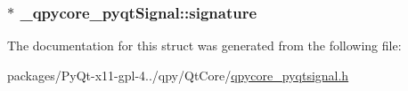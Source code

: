 \subsubsection[{signature}]{$\ast$ \+\_\+qpycore\+\_\+pyqt\+Signal\+::signature}\label{struct__qpycore__pyqtSignal_a9e4afc58539fccafe55e9f272612a6e8}


The documentation for this struct was generated from the following file\+:\begin{DoxyCompactItemize}
\item 
packages/\+Py\+Qt-\/x11-\/gpl-\/4../qpy/\+Qt\+Core/\hyperlink{qpycore__pyqtsignal_8h}{qpycore\+\_\+pyqtsignal.\+h}\end{DoxyCompactItemize}
